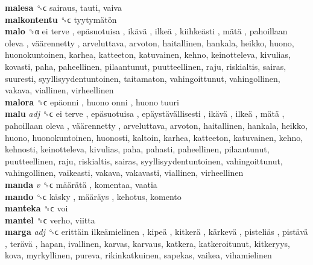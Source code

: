 \textbf{malesa} ␝ϲ  sairaus, tauti, vaiva  \\
\textbf{malkontentu} ␝ϲ   tyytymätön   \\
\textbf{malo} ␝α   ei terve ,  epäsuotuisa ,  ikävä ,  ilkeä ,  kiihkeästi ,  mätä ,  pahoillaan oleva ,  väärennetty , arveluttava, arvoton, haitallinen, hankala, heikko, huono, huonokuntoinen, karhea, katteeton, katuvainen, kehno, keinotteleva, kivulias, kovasti, paha, paheellinen, pilaantunut, puutteellinen, raju, riskialtis, sairas, suuresti, syyllisyydentuntoinen, taitamaton, vahingoittunut, vahingollinen, vakava, viallinen, virheellinen  \\
\textbf{malora} ␝ϲ   epäonni ,  huono onni ,  huono tuuri   \\
\textbf{malu} \emph{adj}  ␝ϲ   ei terve ,  epäsuotuisa ,  epäystävällisesti ,  ikävä ,  ilkeä ,  mätä ,  pahoillaan oleva ,  väärennetty , arveluttava, arvoton, haitallinen, hankala, heikko, huono, huonokuntoinen, huonosti, kaltoin, karhea, katteeton, katuvainen, kehno, kehnosti, keinotteleva, kivulias, paha, pahasti, paheellinen, pilaantunut, puutteellinen, raju, riskialtis, sairas, syyllisyydentuntoinen, vahingoittunut, vahingollinen, vaikeasti, vakava, vakavasti, viallinen, virheellinen  \\
\textbf{manda} \emph{v}  ␝ϲ   määrätä , komentaa, vaatia  \\
\textbf{mando} ␝ϲ   käsky ,  määräys , kehotus, komento  \\
\textbf{manteka} ␝ϲ  voi  \\
\textbf{mantel} ␝ϲ  verho, viitta  \\
\textbf{marga} \emph{adj}  ␝ϲ   erittäin ilkeämielinen ,  kipeä ,  kitkerä ,  kärkevä ,  pisteliäs ,  pistävä ,  terävä , hapan, ivallinen, karvas, karvaus, katkera, katkeroitunut, kitkeryys, kova, myrkyllinen, pureva, rikinkatkuinen, sapekas, vaikea, vihamielinen  \\
